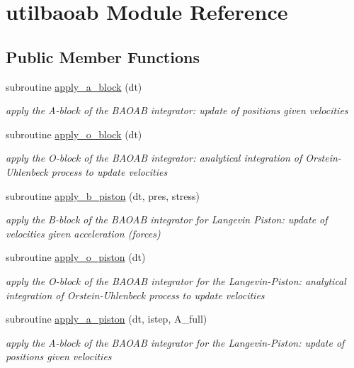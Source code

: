 \hypertarget{classutilbaoab}{\section{utilbaoab Module Reference}
\label{classutilbaoab}
}
\subsection*{Public Member Functions}
\begin{DoxyCompactItemize}
\item 
subroutine \hyperlink{classutilbaoab_a7b1f23a5d26445f55e3b90d0674a2d0d}{apply\-\_\-a\-\_\-block} (dt)
\begin{DoxyCompactList}\small\item\em apply the A-\/block of the B\-A\-O\-A\-B integrator\-: update of positions given velocities \end{DoxyCompactList}\item 
subroutine \hyperlink{classutilbaoab_a4d37fc94de119ad221561c0bb1aa272f}{apply\-\_\-o\-\_\-block} (dt)
\begin{DoxyCompactList}\small\item\em apply the O-\/block of the B\-A\-O\-A\-B integrator\-: analytical integration of Orstein-\/\-Uhlenbeck process to update velocities \end{DoxyCompactList}\item 
subroutine \hyperlink{classutilbaoab_a3d5c863e74be709865803d204c1c2bf2}{apply\-\_\-b\-\_\-piston} (dt, pres, stress)
\begin{DoxyCompactList}\small\item\em apply the B-\/block of the B\-A\-O\-A\-B integrator for Langevin Piston\-: update of velocities given acceleration (forces) \end{DoxyCompactList}\item 
subroutine \hyperlink{classutilbaoab_af550cf0d3589884d811a1dbee44d10f7}{apply\-\_\-o\-\_\-piston} (dt)
\begin{DoxyCompactList}\small\item\em apply the O-\/block of the B\-A\-O\-A\-B integrator for the Langevin-\/\-Piston\-: analytical integration of Orstein-\/\-Uhlenbeck process to update velocities \end{DoxyCompactList}\item 
subroutine \hyperlink{classutilbaoab_a0e3aa519dcd9477a64fae230aeac9742}{apply\-\_\-a\-\_\-piston} (dt, istep, A\-\_\-full)
\begin{DoxyCompactList}\small\item\em apply the A-\/block of the B\-A\-O\-A\-B integrator for the Langevin-\/\-Piston\-: update of positions given velocities \end{DoxyCompactList}\end{DoxyCompactItemize}


